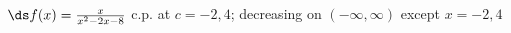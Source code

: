 {$\ds f(x) =\frac{x}{x^2-2x-8}$
}
{c.p. at $c=-2,4$; 
decreasing on $(-\infty,\infty)$ except $x=-2,4$
}
